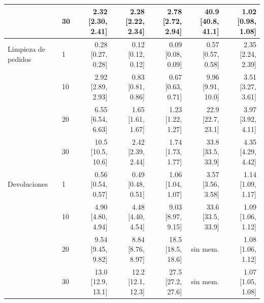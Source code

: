 \begin{tabular}{@{}llrrrrr@{}}
 & 30 & 2.32 {\scriptsize[2.30, 2.41]} & 2.28 {\scriptsize[2.22, 2.34]} & 2.78 {\scriptsize[2.72, 2.94]} & 40.9 {\scriptsize[40.8, 41.1]} & 1.02 {\scriptsize[0.98, 1.08]} \\
\midrule
Limpieza de pedidos & 1 & 0.28 {\scriptsize[0.27, 0.28]} & 0.12 {\scriptsize[0.12, 0.12]} & 0.09 {\scriptsize[0.08, 0.09]} & 0.57 {\scriptsize[0.57, 0.58]} & 2.35 {\scriptsize[2.24, 2.39]} \\
 & 10 & 2.92 {\scriptsize[2.89, 2.93]} & 0.83 {\scriptsize[0.81, 0.86]} & 0.67 {\scriptsize[0.63, 0.71]} & 9.96 {\scriptsize[9.91, 10.0]} & 3.51 {\scriptsize[3.27, 3.61]} \\
 & 20 & 6.55 {\scriptsize[6.54, 6.63]} & 1.65 {\scriptsize[1.61, 1.67]} & 1.23 {\scriptsize[1.22, 1.27]} & 22.9 {\scriptsize[22.7, 23.1]} & 3.97 {\scriptsize[3.92, 4.11]} \\
 & 30 & 10.5 {\scriptsize[10.5, 10.6]} & 2.42 {\scriptsize[2.39, 2.44]} & 1.74 {\scriptsize[1.73, 1.77]} & 33.8 {\scriptsize[33.5, 33.9]} & 4.35 {\scriptsize[4.29, 4.42]} \\
\midrule
Devoluciones & 1 & 0.56 {\scriptsize[0.54, 0.57]} & 0.49 {\scriptsize[0.48, 0.51]} & 1.06 {\scriptsize[1.04, 1.07]} & 3.57 {\scriptsize[3.56, 3.58]} & 1.14 {\scriptsize[1.09, 1.17]} \\
 & 10 & 4.90 {\scriptsize[4.80, 4.94]} & 4.48 {\scriptsize[4.40, 4.54]} & 9.03 {\scriptsize[8.97, 9.15]} & 33.6 {\scriptsize[33.5, 33.9]} & 1.09 {\scriptsize[1.06, 1.12]} \\
 & 20 & 9.54 {\scriptsize[9.45, 9.82]} & 8.84 {\scriptsize[8.76, 8.97]} & 18.5 {\scriptsize[18.5, 18.6]} & sin mem. & 1.08 {\scriptsize[1.06, 1.12]} \\
 & 30 & 13.0 {\scriptsize[12.9, 13.1]} & 12.2 {\scriptsize[12.1, 12.3]} & 27.5 {\scriptsize[27.2, 27.6]} & sin mem. & 1.07 {\scriptsize[1.05, 1.08]} \\
\bottomrule
\end{tabular}